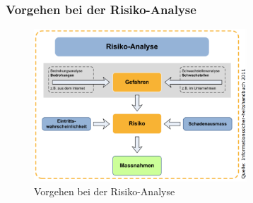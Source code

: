 \documentclass[10pt,a4paper]{article}
\begin{document}
\subsubsection*{Vorgehen bei der Risiko-Analyse}
\begin{figure}[H]
    \begin{center}
    \includegraphics[width=8cm]{images/Risikoanalyse_Vorgehen.png}
    \caption{Vorgehen bei der Risiko-Analyse}
    \label{Risiko-Analyse Vorgehen}
    \end{center}
\end{figure}
\end{document}
